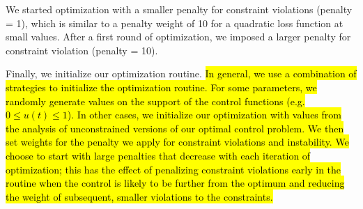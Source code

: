 \documentclass[12pt, oneside]{article}   	%
\begin{document}
We started optimization with a smaller penalty for constraint violations (penalty = 1), which is similar to a penalty weight of 10 for a quadratic loss function at small values. After a first round of optimization, we imposed a larger penalty for constraint violation (penalty = 10).





Finally, we initialize our optimization routine. \hl{In general, we use a combination of strategies to initialize the optimization routine. For some parameters, we randomly generate values on the support of the control functions (e.g. $0\leq u(t) \leq 1$). In other cases, we initialize our optimization with values from the analysis of unconstrained versions of our optimal control problem. We then set weights for the penalty we apply for constraint violations and instability. We choose to start with large penalties that decrease with each iteration of optimization; this has the effect of penalizing constraint violations early in the routine when the control is likely to be further from the optimum and reducing the weight of subsequent, smaller violations to the constraints.}
\end{document}

